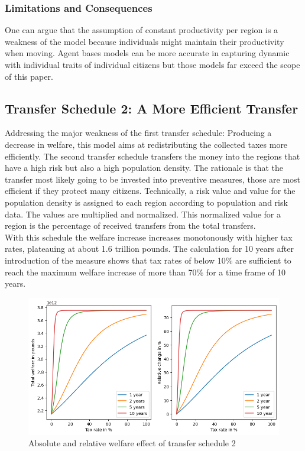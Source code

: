 \documentclass[10pt,a4paper]{article}
\begin{document}
\subsubsection{Limitations and Consequences}
One can argue that the assumption of constant productivity per region is a weakness of the model because individuals might maintain their productivity when moving. Agent bases models can be more accurate in capturing dynamic with individual traits of individual citizens but those models far exceed the scope of this paper.
\\
\subsection{Transfer Schedule 2: A More Efficient Transfer}
Addressing the major weakness of the first transfer schedule: Producing a decrease in welfare, this model aims at redistributing the collected taxes more efficiently.
The second transfer schedule transfers the money into the regions that have a high risk but also a high population density. The rationale is that the transfer most likely going to be invested into preventive measures, those are most efficient if they protect many citizens.
Technically, a risk value and value for the population density is assigned to each region according to population and risk data. The values are multiplied and normalized. This normalized value for a region is the percentage of received transfers from the total transfers.
\\
With this schedule the welfare increase increases monotonously with higher tax rates, plateauing at about 1.6 trillion pounds. The calculation for 10 years after introduction of the measure shows that tax rates of below 10\% are sufficient to reach the maximum welfare increase of more than 70\% for a time frame of 10 years.
\begin{figure}[H]
    \centering
    \includegraphics[width=\textwidth]{Report/Schedule_2_graphics.png}
    \caption{Absolute and relative welfare effect of transfer schedule 2}
    \label{fig:sche2}
\end{figure}
\end{document}
